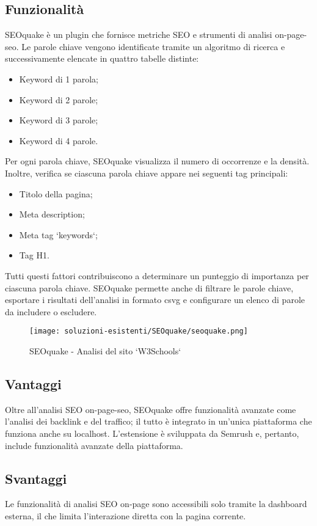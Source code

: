 \subsection{Funzionalità}
\par SEOquake è un plugin che fornisce metriche SEO e strumenti di analisi \gls{on-page-seo}. Le parole chiave vengono identificate tramite un algoritmo di ricerca e successivamente elencate in quattro tabelle distinte:
\begin{itemize}
    \item Keyword di 1 parola;
    \item Keyword di 2 parole;
    \item Keyword di 3 parole;
    \item Keyword di 4 parole.
\end{itemize}
Per ogni parola chiave, SEOquake visualizza il numero di occorrenze e la densità. Inoltre, verifica se ciascuna parola chiave appare nei seguenti tag principali:
\begin{itemize}
    \item Titolo della pagina;
    \item Meta description;
    \item Meta tag `keywords`;
    \item Tag H1.
\end{itemize}
Tutti questi fattori contribuiscono a determinare un punteggio di importanza per ciascuna parola chiave. SEOquake permette anche di filtrare le parole chiave, esportare i risultati dell'analisi in formato \gls{csvg} e configurare un elenco di parole da includere o escludere.

\begin{figure}[H]
    \centering 
    \texttt{[image: soluzioni-esistenti/SEOquake/seoquake.png]} 
    \caption{SEOquake - Analisi del sito `W3Schools`}
\end{figure}

\subsection{Vantaggi}
\par Oltre all'analisi SEO \gls{on-page-seo}, SEOquake offre funzionalità avanzate come l'analisi dei \gls{backlink} e del traffico; il tutto è integrato in un'unica piattaforma che funziona anche su \gls{localhost}. L'estensione è sviluppata da Semrush e, pertanto, include funzionalità avanzate della piattaforma.

\subsection{Svantaggi}
\par Le funzionalità di analisi SEO on-page sono accessibili solo tramite la dashboard esterna, il che limita l'interazione diretta con la pagina corrente.

